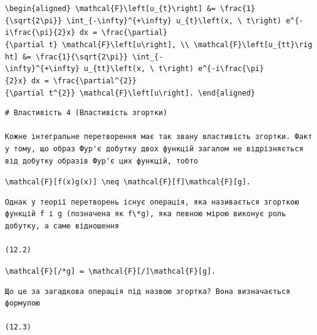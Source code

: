 \documentclass[
  ukrainian,
]{article}
\begin{document}
\texttt{\textbackslash{}begin\{aligned\}\ \textbackslash{}mathcal\{F\}\textbackslash{}left{[}u\_\{t\}\textbackslash{}right{]}\ \&=\ \textbackslash{}frac\{1\}\{\textbackslash{}sqrt\{2\textbackslash{}pi\}\}\ \textbackslash{}int\_\{-\textbackslash{}infty\}\^{}\{+\textbackslash{}infty\}\ u\_\{t\}\textbackslash{}left(x,\ \textbackslash{}\ t\textbackslash{}right)\ e\^{}\{-i\textbackslash{}frac\{\textbackslash{}pi\}\{2\}x\}\ dx\ =\ \textbackslash{}frac\{\textbackslash{}partial\}\{\textbackslash{}partial\ t\}\ \textbackslash{}mathcal\{F\}\textbackslash{}left{[}u\textbackslash{}right{]},\ \textbackslash{}\textbackslash{}\ \textbackslash{}mathcal\{F\}\textbackslash{}left{[}u\_\{tt\}\textbackslash{}right{]}\ \&=\ \textbackslash{}frac\{1\}\{\textbackslash{}sqrt\{2\textbackslash{}pi\}\}\ \textbackslash{}int\_\{-\textbackslash{}infty\}\^{}\{+\textbackslash{}infty\}\ u\_\{tt\}\textbackslash{}left(x,\ \textbackslash{}\ t\textbackslash{}right)\ e\^{}\{-i\textbackslash{}frac\{\textbackslash{}pi\}\{2\}x\}\ dx\ =\ \textbackslash{}frac\{\textbackslash{}partial\^{}\{2\}\}\{\textbackslash{}partial\ t\^{}\{2\}\}\ \textbackslash{}mathcal\{F\}\textbackslash{}left{[}u\textbackslash{}right{]}.\ \textbackslash{}end\{aligned\}}

\begin{verbatim}
# Властивість 4 (Властивість згортки)

Кожне інтегральне перетворення має так звану властивість згортки. Факт у тому, що образ Фур'є добутку двох функцій загалом не відрізняється від добутку образів Фур'є цих функцій, тобто
\end{verbatim}

\texttt{\textbackslash{}mathcal\{F\}{[}f(x)g(x){]}\ \textbackslash{}neq\ \textbackslash{}mathcal\{F\}{[}f{]}\textbackslash{}mathcal\{F\}{[}g{]}.}

\begin{verbatim}
Однак у теорії перетворень існує операція, яка називається згорткою функцій f і g (позначена як f\*g), яка певною мірою виконує роль добутку, а саме відношення

(12.2)
\end{verbatim}

\texttt{\textbackslash{}mathcal\{F\}{[}/*g{]}\ =\ \textbackslash{}mathcal\{F\}{[}/{]}\textbackslash{}mathcal\{F\}{[}g{]}.}

\begin{verbatim}
Що це за загадкова операція під назвою згортка? Вона визначається формулою

(12.3)
\end{verbatim}
\end{document}

